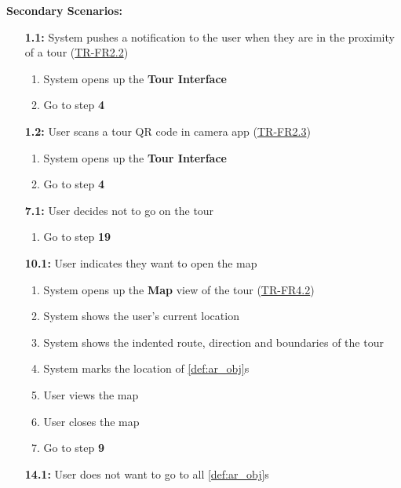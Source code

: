 \documentclass{article}
\begin{document}
\begin{enumerate}[label=\textbf{UC\arabic*}]
        \textbf{Secondary Scenarios:}
        \begin{itemize}
            \item[{\bf 1.1:}] System pushes a notification to the user when they are in the proximity of a tour (\hyperref[ssub:touring]{TR-FR2.2})
            \begin{enumerate}[label=\textbf{\arabic*.}]
                \item System opens up the \textbf{Tour Interface}
                \item Go to step \textbf{4}
            \end{enumerate}
            \item[{\bf 1.2:}] User scans a tour QR code in camera app (\hyperref[ssub:touring]{TR-FR2.3})
            \begin{enumerate}[label=\textbf{\arabic*.}]
                \item System opens up the \textbf{Tour Interface}
                \item Go to step \textbf{4}
            \end{enumerate}
            \item[{\bf 7.1:}] User decides not to go on the tour
            \begin{enumerate}[label=\textbf{\arabic*.}]
                \item Go to step \textbf{19}
            \end{enumerate}
            \item[{\bf 10.1:}] User indicates they want to open the map
            \begin{enumerate}[label=\textbf{\arabic*.}]
                \item System opens up the \textbf{Map} view of the tour (\hyperref[ssub:touring]{TR-FR4.2})
                \item System shows the user’s current location
                \item System shows the indented route, direction and boundaries of the tour
                \item System marks the location of \ref{def:ar_obj}s
                \item User views the map
                \item User closes the map
                \item Go to step \textbf{9}
            \end{enumerate}
            \item[{\bf 14.1:}] User does not want to go to all \ref{def:ar_obj}s

\end{itemize}
\end{enumerate}
\end{document}
